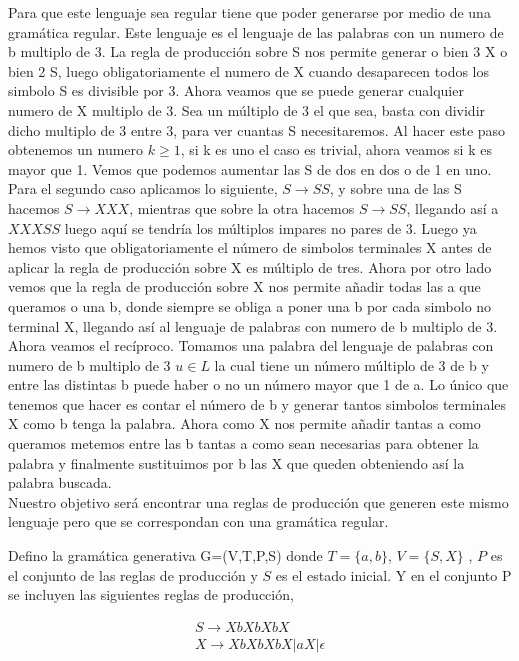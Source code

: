\documentclass[a4paper,11pt]{article}
\begin{document}
Para que este lenguaje sea regular tiene que poder generarse por medio de una gramática regular. Este lenguaje es el lenguaje de las palabras con un numero de b multiplo de 3. La regla de producción sobre S nos permite generar o bien 3 X o bien 2 S, luego obligatoriamente el numero de X cuando desaparecen todos los simbolo S es divisible por 3. Ahora veamos que se puede generar cualquier numero de X multiplo de 3. Sea un múltiplo de 3 el que sea, basta con dividir dicho multiplo de 3 entre 3, para ver cuantas S necesitaremos. Al hacer este paso obtenemos un numero $k \geq 1$, si k es uno el caso es trivial, ahora veamos si k es mayor que 1. Vemos que podemos aumentar las S de dos en dos o de 1 en uno. Para el segundo caso aplicamos lo siguiente, $S\rightarrow SS$, y sobre una de las S hacemos $S\rightarrow XXX$, mientras que sobre la otra hacemos $S \rightarrow SS$, llegando así a $XXXSS$ luego aquí se tendría los múltiplos impares no pares de 3. Luego ya hemos visto que obligatoriamente el número de simbolos terminales X antes de aplicar la regla de producción sobre X es múltiplo de tres. Ahora por otro lado vemos que la regla de producción sobre X nos permite añadir todas las a que queramos o una b, donde siempre se obliga a poner una b por cada simbolo no terminal X, llegando así al lenguaje de palabras con numero de b multiplo de 3. \\

Ahora veamos el recíproco. Tomamos una palabra del lenguaje de palabras con numero de b multiplo de 3 $u \in L$ la cual tiene un número múltiplo de 3 de b y entre las distintas b puede haber o no un número mayor que 1 de a. Lo único que tenemos que hacer es contar el número de b y generar tantos simbolos terminales X como b tenga la palabra. Ahora como X nos permite añadir tantas a como queramos metemos entre las b tantas a como sean necesarias para obtener la palabra y finalmente sustituimos por b las X que queden obteniendo así la palabra buscada. \\

Nuestro objetivo será encontrar una reglas de producción que generen este mismo lenguaje pero que se correspondan con una gramática regular.

Defino la gramática generativa G=(V,T,P,S) donde $T=\{a,b\}$, $V=\{S,X\}$ , $P$ es el conjunto de las reglas de producción y $S$ es el estado inicial. Y en el conjunto P se incluyen las siguientes reglas de producción, 

\begin{align*}
S\rightarrow XbXbXbX \\
X \rightarrow XbXbXbX|aX|\epsilon
\end{align*}
\end{document}
